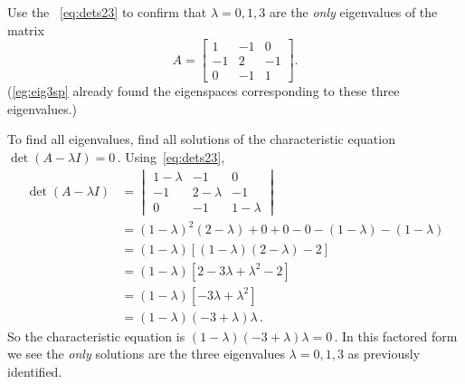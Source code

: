 \begin{example} \label{eg:eig3introval}
Use the ~\eqref{eq:dets23} to confirm that \(\lambda=0,1,3\) are the \emph{only} eigenvalues of the matrix
\begin{equation*}
A=\begin{bmatrix} 1&-1&0\\-1&2&-1\\0&-1&1 \end{bmatrix}.
\end{equation*}
(\cref{eg:eig3sp} already found the eigenspaces corresponding to these three eigenvalues.)
\begin{solution} 
To find all eigenvalues, find all solutions of the characteristic equation \(\det(A-\lambda I)=0\)\,.  
Using~\eqref{eq:dets23},
\begin{align*}
\det(A-\lambda I)
&{}=\begin{vmatrix} 1-\lambda&-1&0\\-1&2-\lambda&-1\\0&-1&1-\lambda \end{vmatrix}
\\&{}=(1-\lambda)^2(2-\lambda)+0+0-0-(1-\lambda)-(1-\lambda)
\\&{}=(1-\lambda)\left[(1-\lambda)(2-\lambda)-2\right]
\\&{}=(1-\lambda)\left[2-3\lambda+\lambda^2-2\right]
\\&{}=(1-\lambda)\left[-3\lambda+\lambda^2\right]
\\&{}=(1-\lambda)(-3+\lambda)\lambda\,.
\end{align*}
So the characteristic equation is \((1-\lambda)(-3+\lambda)\lambda=0\)\,. 
In this factored form we see the \emph{only} solutions are the three eigenvalues \(\lambda=0,1,3\) as previously identified.
\end{solution}
\end{example}




